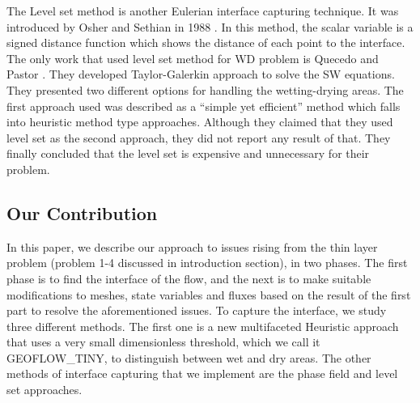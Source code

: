\documentclass[letterpaper,10pt]{article}
\begin{document}
The Level set method is another Eulerian interface capturing technique. It was introduced by Osher and Sethian in 1988 \cite{Osher1988}. In this method, the scalar variable is a signed distance 
function which shows the distance of each point to the interface. 
The only work that used level set method for WD problem is Quecedo and Pastor \cite{quecedo2002rtg}. They developed Taylor-Galerkin approach to solve the SW equations. They presented two 
different options for handling the wetting-drying areas. The first approach used was described as a ``simple yet efficient'' method which falls into heuristic method type approaches. 
Although they claimed that they used level set as the second approach, they did not report any result of that. They finally concluded that the level set is expensive and unnecessary for their problem.\newline



\subsection{Our Contribution}
In this paper, we describe our approach to issues rising from the thin layer problem (problem 1-4 discussed in introduction section), in  two phases. The first phase is to find the interface of the 
flow, and the next  is to make suitable modifications to meshes, state variables and fluxes based on the result of the first part to resolve the aforementioned issues.
To capture the interface, we study three different methods. The first one is a new multifaceted Heuristic approach that uses a very small dimensionless threshold, which we call it GEOFLOW\_TINY, to 
distinguish between wet and dry areas. The other methods of interface capturing that we implement are the phase field and  level set approaches.
\end{document}
